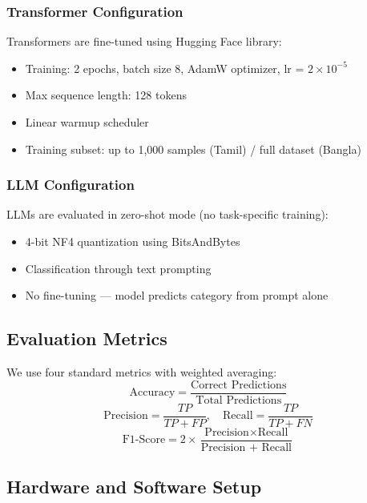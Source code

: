 \documentclass[conference]{IEEEtran}
\begin{document}
\subsubsection{Transformer Configuration}
Transformers are fine-tuned using Hugging Face library:
\begin{itemize}
\item Training: 2 epochs, batch size 8, AdamW optimizer, lr = $2 \times 10^{-5}$
\item Max sequence length: 128 tokens
\item Linear warmup scheduler
\item Training subset: up to 1,000 samples (Tamil) / full dataset (Bangla)
\end{itemize}

\subsubsection{LLM Configuration}
LLMs are evaluated in zero-shot mode (no task-specific training):
\begin{itemize}
\item 4-bit NF4 quantization using BitsAndBytes
\item Classification through text prompting
\item No fine-tuning --- model predicts category from prompt alone
\end{itemize}

\subsection{Evaluation Metrics}

We use four standard metrics with weighted averaging:
\begin{equation}
\text{Accuracy} = \frac{\text{Correct Predictions}}{\text{Total Predictions}}
\end{equation}
\begin{equation}
\text{Precision} = \frac{TP}{TP + FP}, \quad \text{Recall} = \frac{TP}{TP + FN}
\end{equation}
\begin{equation}
\text{F1-Score} = 2 \times \frac{\text{Precision} \times \text{Recall}}{\text{Precision + Recall}}
\end{equation}

\subsection{Hardware and Software Setup}
\end{document}
